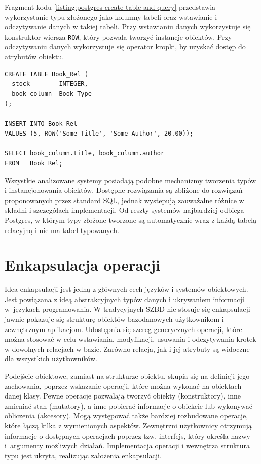 \documentclass[a4paper,twoside,12pt]{book}
\begin{document}
Fragment kodu \ref{listing:postgres-create-table-and-query} przedstawia wykorzystanie typu złożonego jako kolumny tabeli oraz wstawianie i odczytywanie danych w takiej tabeli. Przy wstawianiu danych wykorzystuje się konstruktor wiersza \lstinline{ROW}, który pozwala tworzyć instancje obiektów. Przy odczytywaniu danych wykorzystuje się operator kropki, by uzyskać dostęp do atrybutów obiektu. 

\begin{lstlisting}[style=SQL, caption={Wykorzystanie typu złożonego w PostgreSQL.}, label={listing:postgres-create-table-and-query}, captionpos=b]
CREATE TABLE Book_Rel (
  stock        INTEGER,
  book_column  Book_Type
);

INSERT INTO Book_Rel 
VALUES (5, ROW('Some Title', 'Some Author', 20.00));

SELECT book_column.title, book_column.author
FROM   Book_Rel;
\end{lstlisting}

Wszystkie analizowane systemy posiadają podobne mechanizmy tworzenia typów i instancjonowania obiektów. Dostępne rozwiązania są zbliżone do rozwiązań proponowanych przez standard SQL, jednak wystepują zauważalne różnice w składni i szczegółach implementacji. Od reszty systemów najbardziej odbiega Postgres, w którym typy złożone tworzone są automatycznie wraz z każdą tabelą relacyjną i nie ma tabel typowanych. 

\section{Enkapsulacja operacji}
\label{section:enkapsulacja}

Idea enkapsulacji jest jedną z głównych cech języków i systemów obiektowych. Jest powiązana z ideą abstrakcyjnych typów danych i ukrywaniem informacji w~językach programowania. W tradycyjnych SZBD nie stosuje się enkapsulacji - jawnie pokazuje się strukturę obiektów bazodanowych użytkownikom i zewnętrznym aplikacjom. Udostępnia się szereg generycznych operacji, które można stosować w celu wstawiania, modyfikacji, usuwania i odczytywania krotek w dowolnych relacjach w bazie. Zarówno relacja, jak i jej atrybuty są widoczne dla wszystkich użytkowników.

Podejście obiektowe, zamiast na strukturze obiektu, skupia się na definicji jego zachowania, poprzez wskazanie operacji, które można wykonać na obiektach danej klasy. Pewne operacje pozwalają tworzyć obiekty (konstruktory), inne zmieniać stan (mutatory), a inne pobierać informacje o obiekcie lub wykonywać obliczenia (akcesory). Mogą występować także bardziej rozbudowane operacje, które łączą kilka z wymienionych aspektów. Zewnętrzni użytkownicy otrzymują informacje o dostępnych operacjach poprzez tzw. interfejs, który określa nazwy i~argumenty możliwych działań. Implementacja operacji i wewnętrza struktura typu jest ukryta, realizując założenia enkapsulacji. 
\end{document}
